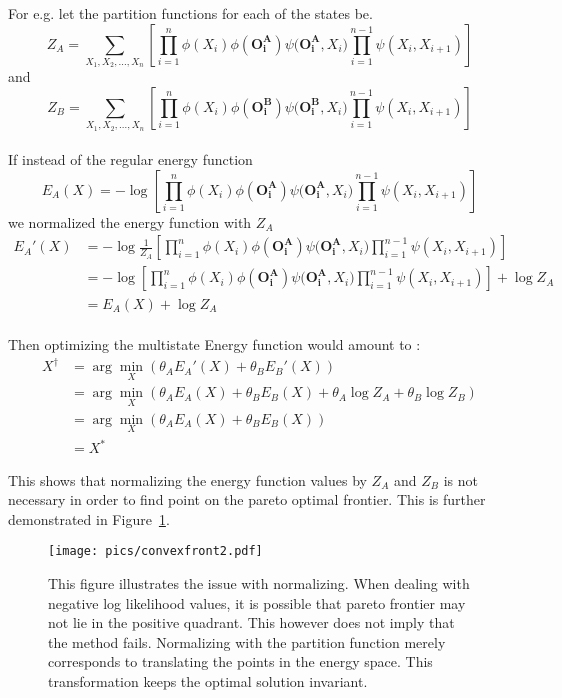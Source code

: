 \documentclass{article}
\begin{document}
For e.g. let the partition functions for each of the states be.
\[
Z_A = \sum_{X_1,X_2,\dotsc,X_n}\left[{\prod_{i=1}^{n}{\phi(X_i)\phi(\mathbf{O^A_i})\psi(\mathbf{O^A_i},X_i})\prod_{i=1}^{n-1}{\psi(X_i,X_{i+1})}}\right]
\]
and 
\[
Z_B = \sum_{X_1,X_2,\dotsc,X_n}\left[{\prod_{i=1}^{n}{\phi(X_i)\phi(\mathbf{O^B_i})\psi(\mathbf{O^B_i},X_i})\prod_{i=1}^{n-1}{\psi(X_i,X_{i+1})}}\right]
\]
\\
If instead of the regular energy function 
\[
E_A(X) = -\log  \left[{\prod_{i=1}^{n}{\phi(X_i)\phi(\mathbf{O^A_i})\psi(\mathbf{O^A_i},X_i})\prod_{i=1}^{n-1}{\psi(X_i,X_{i+1})}}\right]
\]
we normalized the energy function with $Z_A$
\[
\begin{split}
E_A'(X) &= -\log  \frac{1}{Z_A} \left[{\prod_{i=1}^{n}{\phi(X_i)\phi(\mathbf{O^A_i})\psi(\mathbf{O^A_i},X_i})\prod_{i=1}^{n-1}{\psi(X_i,X_{i+1})}}\right]\\
 &= -\log   \left[{\prod_{i=1}^{n}{\phi(X_i)\phi(\mathbf{O^A_i})\psi(\mathbf{O^A_i},X_i})\prod_{i=1}^{n-1}{\psi(X_i,X_{i+1})}}\right] + \log Z_A \\
	&= E_A(X) + \log Z_A
\end{split}
\]
\\
Then optimizing the multistate Energy function would amount to : 
\[
\begin{split}
X^{\dagger} &= \arg \min_X \left( \theta_A E_A'(X)  + \theta_B E_B'(X) \right) \\
 &= \arg \min_X \left( \theta_A E_A(X) + \theta_B E_B(X) + \theta_A \log Z_A + \theta_B \log Z_B \right) \\
 &= \arg \min_X \left( \theta_A E_A(X) + \theta_B E_B(X) \right) \\
  &= X^*
\end{split}
\]

This shows that normalizing the energy function values by $Z_A$ and $Z_B$ is not necessary in order to find point on the pareto optimal frontier. This is further demonstrated in Figure~\ref{fig:cvxfront2}.

\begin{figure}[h!]
    \centering
    \texttt{[image: pics/convexfront2.pdf]}
    \caption{This figure illustrates the issue with normalizing. When dealing with negative log likelihood values, it is possible that pareto frontier may not lie in the positive quadrant. This however does not imply that the method fails. Normalizing with the partition function merely corresponds to translating the points in the energy space. This transformation keeps the optimal solution invariant.  }
    \label{fig:cvxfront2}
\end{figure}
\pagebreak
\end{document}
